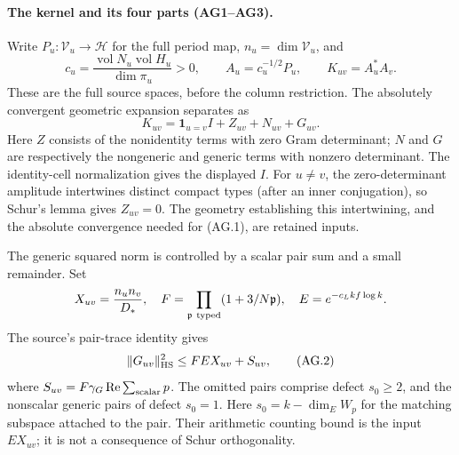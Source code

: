 \documentclass[11pt,a4paper]{article}
\numberwithin{equation}{section}
\theoremstyle{remark}\newtheorem{remark}[theorem]{Remark}
\begin{document}
\paragraph{The kernel and its four parts (AG1--AG3).}
Write \(P_u:\mathcal V_u\to\mathcal H\) for the full period map,
\(n_u=\dim\mathcal V_u\), and
\[
 c_u=\frac{\operatorname{vol}N_u\operatorname{vol}H_u}
                 {\dim\pi_u}>0,\qquad
 A_u=c_u^{-1/2}P_u,\qquad K_{uv}=A_u^*A_v .
\]
These are the full source spaces, before the column restriction.
The absolutely convergent geometric expansion separates as
\[
 K_{uv}=\mathbf1_{u=v}I+Z_{uv}+N_{uv}+G_{uv}.                 \tag{AG.1}
\]
Here \(Z\) consists of the nonidentity terms with zero Gram
determinant; \(N\) and \(G\) are respectively the nongeneric and
generic terms with nonzero determinant.  The identity-cell
normalization gives the displayed \(I\).  For \(u\ne v\), the
zero-determinant amplitude intertwines distinct compact types
(after an inner conjugation), so Schur's lemma gives \(Z_{uv}=0\).
The geometry establishing this intertwining, and the absolute
convergence needed for (AG.1), are retained inputs.

The generic squared norm is controlled by a scalar pair sum and a
small remainder.  Set
\[
 X_{uv}=\frac{n_un_v}{D_*},\quad
 F=\prod_{\mathfrak p\ {\rm typed}}(1+3/N\mathfrak p),\quad
 E=e^{-c_Lkf\log k}.
\]
The source's pair-trace identity gives
\[
 \|G_{uv}\|_{\rm HS}^2\le FE X_{uv}+S_{uv},                 \tag{AG.2}
\]
where \(S_{uv}=F\gamma_G\operatorname{Re}\sum_{\rm scalar}p\).
The omitted pairs comprise defect \(s_0\ge2\), and the nonscalar
generic pairs of defect \(s_0=1\).  Here \(s_0=k-\dim_E W_p\)
for the matching subspace attached to the pair.  Their arithmetic counting bound is the
input \(E X_{uv}\); it is not a consequence of Schur orthogonality.
\end{document}
